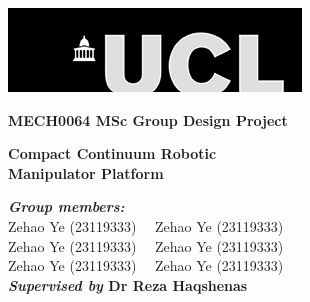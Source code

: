 \begin{titlepage}
\begin{center}
        \begin{center}
        \includegraphics[width=.70\textwidth]{Image/ucl_logo.png}
        \vspace{0.5cm}
        \end{center}
        \vspace*{0.1cm}
        \vspace{2cm}
        {\LARGE\textbf{MECH0064 MSc Group Design Project\\}}

        \vspace{2cm}
        {\Huge\textbf{Compact Continuum Robotic\\}}
        \vspace{0.25cm}
        {\Huge\textbf{Manipulator Platform\\}}

        \vfill

        \begin{flushleft}
        \textbf{\emph{Group members:}} \\
        Zehao Ye (23119333)~~ Zehao Ye (23119333)\\ 
        Zehao Ye (23119333)~~ Zehao Ye (23119333)\\ 
        Zehao Ye (23119333)~~ Zehao Ye (23119333)\\ 
        \textbf{\emph{Supervised by} Dr Reza Haqshenas}
        \end{flushleft}
        \vspace{0.8cm}
\end{center}
\end{titlepage}

